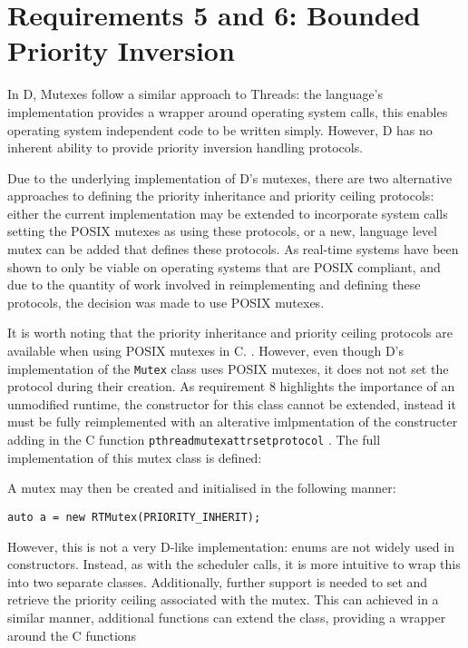 \section{Requirements 5 and 6: Bounded Priority Inversion}
In D, Mutexes follow a similar approach to Threads: the language's
implementation provides a wrapper around operating system calls, this 
enables operating system independent code to be written simply. However, D has no 
inherent ability to provide priority inversion handling protocols. 
\par\bigskip\noindent
Due to the underlying implementation of D's mutexes, there are two alternative 
approaches to defining the priority inheritance and priority ceiling protocols: 
either the current implementation may be extended to incorporate system calls 
setting the POSIX mutexes as using these protocols, or a new, language level 
mutex can be added that defines these protocols. As real-time systems have been 
shown to only be viable on operating systems that are POSIX compliant, and due to 
the quantity of work involved in reimplementing and defining these protocols, the 
decision was made to use POSIX mutexes. 
\par\bigskip\noindent
It is worth noting that the priority inheritance and priority ceiling protocols 
are available when using POSIX mutexes in C. 
\cite{mutex-setprotocol}. However, even though D's implementation of the \texttt{Mutex} 
class uses POSIX mutexes, it does not not set the protocol during their creation. 
As requirement 8 highlights the importance of an unmodified runtime, the 
constructor for this class cannot be extended, instead it must be fully 
reimplemented with an alterative imlpmentation of the constructer adding in 
the C function \texttt{pthread\textunderscore{}mutexattr\textunderscore{}setprotocol} \cite{mutex-setprotocol}. 
The full implementation of this mutex class is defined:

A mutex may then be created and initialised in the following manner: 
\begin{lstlisting}
auto a = new RTMutex(PRIORITY_INHERIT);
\end{lstlisting}
However, this is not a very D-like implementation: enums are not widely used 
in constructors. Instead, as with the scheduler calls, 
it is more intuitive to wrap this into two separate classes. Additionally, 
further support 
is needed to set and retrieve the priority ceiling associated with the 
mutex. This can achieved in a similar manner, additional 
functions can extend the class, providing a wrapper around the C functions 

